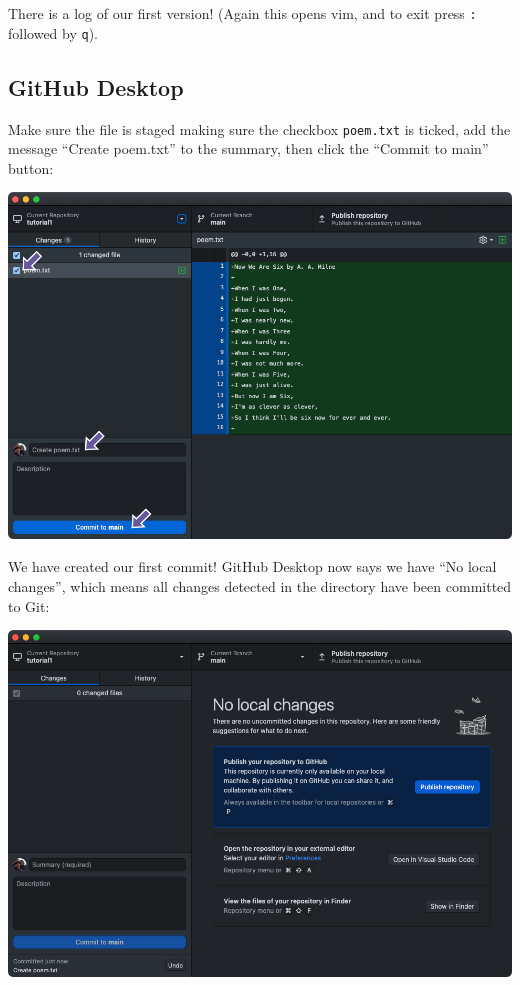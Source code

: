 \documentclass[
  letterpaper,
  DIV=11,
  numbers=noendperiod]{scrartcl}
\begin{document}
There is a log of our first version! (Again this opens vim, and to exit
press \texttt{:} followed by \texttt{q}).

\subsection{GitHub Desktop}

Make sure the file is staged making sure the checkbox \texttt{poem.txt}
is ticked, add the message ``Create poem.txt'' to the summary, then
click the ``Commit to main'' button:

\includegraphics{images/image11.png}

We have created our first commit! GitHub Desktop now says we have ``No
local changes'', which means all changes detected in the directory have
been committed to Git:

\includegraphics{images/image12.png}
\end{document}
